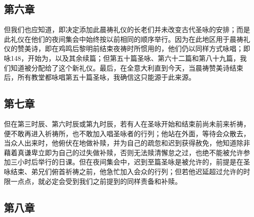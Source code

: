
\subsection{第六章}

\par

但我们也应知道，即决定添加此晨祷礼仪的长老们并未改变古代圣咏的安排；而是此礼仪在他们的夜间集会中始终按以前相同的顺序举行。因为在此地区用于晨祷礼仪的赞美诗，即在鸡鸣后黎明前结束夜祷时所惯用的，他们仍以同样方式咏唱；即咏148，开始为，以及其余续篇；但第五十篇圣咏、第六十二篇和第八十九篇，我们知道被分配给了这个新礼仪。最后，在全意大利直到今天，当晨祷赞美诗结束后，所有教堂都咏唱第五十篇圣咏，我确信这只能源于此来源。\par


\subsection{第七章}

\par

但在第三时辰、第六时辰或第九时辰，若有人在圣咏开始和结束前尚未前来祈祷，便不敢再进入祈祷所，也不敢加入唱圣咏者的行列；他站在外面，等待会众散去，当众人出来时，他俯伏在地做补赎，并为自己的疏忽和迟到获得赦免，他知道除非藉着真谦卑立即为自己的过失做补赎，否则无法赎清懈怠之过，也绝不能被允许参加三小时后举行的日课。但在夜间集会中，迟到至篇圣咏是被允许的，前提是在圣咏结束、弟兄们俯首祈祷之前，他急忙加入会众的行列；但若他迟延超过允许的时限一点点，就必定会受到我们之前提到的同样责备和补赎。\par


\subsection{第八章}

\par

